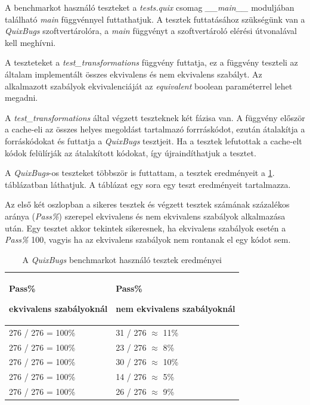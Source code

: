A benchmarkot használó teszteket a \emph{tests.quix} csomag \emph{\_\_main\_\_} moduljában található
\emph{main} függvénnyel futtathatjuk.
A tesztek futtatásához szükségünk van a \emph{QuixBugs} szoftvertárolóra, %
a \emph{main} függvényt a szoftvertároló elérési útvonalával kell meghívni.

A teszteteket a \emph{test\_transformations} függvény futtatja,
ez a függvény teszteli az általam implementált összes ekvivalens és nem ekvivalens szabályt.
Az alkalmazott szabályok ekvivalenciáját az \emph{equivalent} boolean paraméterrel lehet megadni.

A \emph{test\_transformations} által végzett teszteknek két fázisa van.
A függvény először a cache-eli az összes helyes megoldást tartalmazó forrráskódot,
ezután átalakítja a forráskódokat és futtatja a \emph{QuixBugs} tesztjeit.
Ha a tesztek lefutottak a cache-elt kódok felülírják az átalakított kódokat,
így újraindíthatjuk a tesztet.

A \emph{QuixBugs}-os teszteket többször is futtattam,
a tesztek eredményeit a \ref{tab:quix_tests}. táblázatban láthatjuk.
A táblázat egy sora egy teszt eredményeit tartalmazza.

Az első két oszlopban a sikeres tesztek és végzett tesztek számának százalékos aránya (\emph{Pass\%})
szerepel ekvivalens és nem ekvivalens szabályok alkalmazása után.
Egy tesztet akkor tekintek sikeresnek, ha ekvivalens szabályok esetén a \emph{Pass\%} 100,
vagyis ha az ekvivalens szabályok nem rontanak el egy kódot sem.

\begin{table}[H]
	\centering
	\begin{tabular}{ | m{} | m{} | }
		\hline
		\textbf{Pass\%}
		
		\textbf{ekvivalens szabályoknál}
		&
		\textbf{Pass\%}
		
		\textbf{nem ekvivalens szabályoknál}
		\\
		\hline \hline
		276 / 276 = 100\% & 31 / 276 $\approx$ 11\% \\
		\hline
		276 / 276 = 100\% & 23 / 276 $\approx$ 8\% \\
		\hline
		276 / 276 = 100\% & 30 / 276 $\approx$ 10\% \\
		\hline
		276 / 276 = 100\% & 14 / 276 $\approx$ 5\% \\
		\hline
		276 / 276 = 100\% & 26 / 276 $\approx$ 9\% \\
		\hline
	\end{tabular}
	\caption{A \emph{QuixBugs} benchmarkot használó tesztek eredményei}
	\label{tab:quix_tests}
\end{table}

